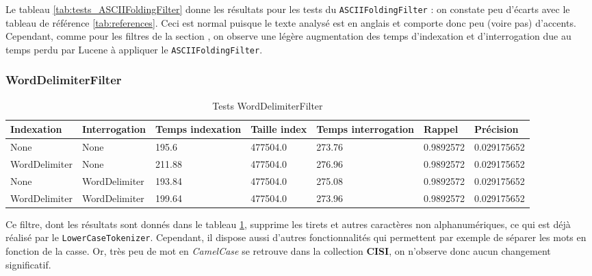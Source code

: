 Le tableau \ref{tab:tests_ASCIIFoldingFilter} donne les résultats pour les tests du \texttt{ASCIIFoldingFilter} : on constate peu d’écarts avec le tableau de référence \ref{tab:references}. Ceci est normal puisque le texte analysé est en anglais et comporte donc peu (voire pas) d’accents. Cependant, comme pour les filtres de la section \label{section:filtrespourris}, on observe une légère augmentation des temps d’indexation et d’interrogation due au temps perdu par Lucene à appliquer le \texttt{ASCIIFoldingFilter}.

\subsubsection{WordDelimiterFilter}

\begin{table}[!htbp]
    \hspace{-2cm}
                \begin{tabular}{|p{2.1cm}|p{2.1cm}|p{2cm}|p{2cm}|p{2.5cm}|p{2.5cm}|p{2.5cm}|}
                    \hline
                    \textbf{Indexation} & \textbf{Interrogation} & \textbf{Temps \mbox{indexation}} & \textbf{Taille \mbox{index}} & \textbf{Temps \mbox{interrogation}} & \textbf{Rappel} & \textbf{Précision}\\
                    \hline
                    None & None & 195.6 & 477504.0 & 273.76 & 0.9892572 & 0.029175652\\
                    \hline
WordDelimiter & None & 211.88 & 477504.0 & 276.96 & 0.9892572 & 0.029175652\\
		\hline
None & WordDelimiter & 193.84 & 477504.0 & 275.08 & 0.9892572 & 0.029175652\\
		\hline
WordDelimiter & WordDelimiter & 199.64 & 477504.0 & 273.96 & 0.9892572 & 0.029175652\\
                    \hline
                \end{tabular}
                \caption{Tests WordDelimiterFilter}
                \label{tab:tests_WordDelimiterFilter}
            \end{table}

Ce filtre, dont les résultats sont donnés dans le tableau \ref{tab:tests_WordDelimiterFilter}, supprime les tirets et autres caractères non alphanumériques, ce qui est déjà réalisé par le \texttt{LowerCaseTokenizer}. Cependant, il dispose aussi d’autres fonctionnalités qui permettent par exemple de séparer les mots en fonction de la casse. Or, très peu de mot en \textit{CamelCase} se retrouve dans la collection \textbf{CISI}, on n'observe donc aucun changement significatif.

